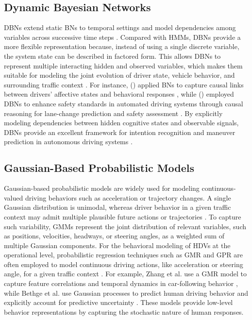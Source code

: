 \subsection{Dynamic Bayesian Networks}
\acp{DBN} extend static \acp{BN} to temporal settings and model dependencies among variables across successive time steps \cite{murphy2002dynamic,pearl1995bayesian}. 
Compared with \acp{HMM}, \acp{DBN} provide a more flexible representation because, instead of using a single discrete variable, the system state can be described in factored form.
This allows \acp{DBN} to represent multiple interacting hidden and observed variables, which makes them suitable for modeling the joint evolution of driver state, 
vehicle behavior, and surrounding traffic context \cite{electronics8010040}. For instance, \citeauthor{młynarczyk2025bayesiannetworkapproachbuilding} (\citeyear{młynarczyk2025bayesiannetworkapproachbuilding}) 
applied \acp{BN} to capture causal links between drivers’ affective states and behavioral responses \cite{młynarczyk2025bayesiannetworkapproachbuilding}, while
\citeauthor{talluri2025enhancingsafetystandardsautomated} (\citeyear{talluri2025enhancingsafetystandardsautomated}) employed \acp{DBN} to enhance safety standards in automated driving systems through
causal reasoning for lane-change prediction and safety assessment \cite{talluri2025enhancingsafetystandardsautomated}. By explicitly modeling dependencies
between hidden cognitive states and observable signals, \acp{DBN} provide an excellent framework for intention
recognition and maneuver prediction in autonomous driving systems \cite{electronics8010040}.

\subsection{Gaussian-Based Probabilistic Models}
Gaussian-based probabilistic models are widely used for modeling continuous-valued driving behaviors
such as acceleration or trajectory changes. A single Gaussian distribution is unimodal, 
whereas driver behavior in a given traffic context may admit multiple plausible future actions or trajectories  
\cite{mozaffari2023multimodalmanoeuvretrajectoryprediction}. 
To capture such variability, \acp{GMM} represent the joint distribution of relevant variables, such as positions, velocities, 
headways, or steering angles, as a weighted sum of multiple Gaussian components. 
For the behavioral
modeling of \acp{HDV} at the operational level, probabilistic regression techniques such as \ac{GMR} and \ac{GPR} are often employed to model continuous
driving actions, like acceleration or steering angle, for a given traffic context \cite{zhang2024learningcarfollowingbehaviorsusing,Bethge2023ModelPC}. 
For example, Zhang et al. use a \ac{GMR} model to capture feature correlations and temporal dynamics in car-following behavior \cite{zhang2024learningcarfollowingbehaviorsusing}, 
while Bethge et al. use Gaussian processes to predict human driving behavior and explicitly account for predictive uncertainty \cite{Bethge2023ModelPC}. These models provide low-level 
behavior representations by capturing the stochastic nature of human responses.




